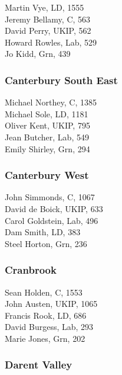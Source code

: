 \documentclass[a4paper,openany,10pt]{book}
\begin{document}


Martin Vye, LD, 1555\\
Jeremy Bellamy, C, 563\\
David Perry, UKIP, 562\\
Howard Rowles, Lab, 529\\
Jo Kidd, Grn, 439\\


\subsubsection*{Canterbury South East}



Michael Northey, C, 1385\\
Michael Sole, LD, 1181\\
Oliver Kent, UKIP, 795\\
Jean Butcher, Lab, 549\\
Emily Shirley, Grn, 294\\


\subsubsection*{Canterbury West}



John Simmonds, C, 1067\\
David de Boick, UKIP, 633\\
Carol Goldstein, Lab, 496\\
Dam Smith, LD, 383\\
Steel Horton, Grn, 236\\


\subsubsection*{Cranbrook}



Sean Holden, C, 1553\\
John Austen, UKIP, 1065\\
Francis Rook, LD, 686\\
David Burgess, Lab, 293\\
Marie Jones, Grn, 202\\


\subsubsection*{Darent Valley}
\end{document}
